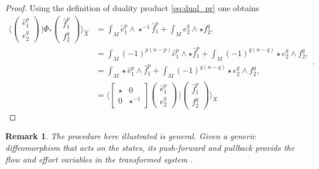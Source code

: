\documentclass{elsarticle}
\newtheorem{remark}{Remark}
\newcommand*{\dual}[1]{\ensuremath{\widehat{#1}}}
\newcommand{\dualpr}[3][]{\ensuremath{\langle #2 \, \vert #3 \rangle_{#1}}}
\begin{document}
{\begin{proof}
Using the definition of duality product \eqref{eq:dual_pr} one obtains
\begin{equation}
    \begin{aligned}
    \dualpr[\dual{X}]{\begin{pmatrix}
      \dual{e}^p_1 \\ 
      {e}^q_2
    \end{pmatrix}}{\Phi_*\begin{pmatrix}
	\dual{f}^p_1 \\
	f^q_2
	\end{pmatrix}} &=\int_M \dual{e}^{p}_1 \wedge \star^{-1} \dual{f}^p_1 + \int_M {e}_2^{q} \wedge \star f^q_2, \\
        &= \int_M (-1)^{p(n-p)}\dual{e}^p_1 \wedge \star \dual{f}^p_1 + \int_M (-1)^{q(n-q)}\star {e}^q_2 \wedge f^q_2, \\
        &= \int_M \star \dual{e}^p_1 \wedge \dual{f}^p_1 + \int_M (-1)^{q(n-q)}\star {e}^q_2 \wedge f^q_2, \\
        &=  \dualpr[X]{\begin{bmatrix}
        \star & 0 \\
        0 & \star^{-1}
    \end{bmatrix}\begin{pmatrix}
      \dual{e}^p_1 \\ 
      {e}^q_2
    \end{pmatrix}}{\begin{pmatrix}
	\dual{f}^p_1 \\
	f^q_2
	\end{pmatrix}}
    \end{aligned}.
\end{equation}
\end{proof}
\begin{remark}
The procedure here illustrated is general. Given a generic diffeomorphism that acts on the states, its push-forward and pullback provide the flow and effort variables in the transformed system \cite{rashad2021part1,vankerschaver2010}.
\end{remark}
}
\end{document}
